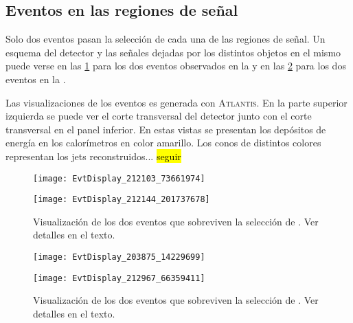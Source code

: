 


\subsection{Eventos en las regiones de señal}

Solo dos eventos pasan la
selección de cada una de las regiones de señal. Un esquema del detector y las
se\~nales dejadas por los distintos objetos en el mismo puede verse en las
\cref{fig:evdisplay_srl} para los dos eventos observados en la {\SRL} y en las
\cref{fig:evdisplay_srh} para los dos eventos en la {\SRH}.

Las visualizaciones de los eventos es generada con
\textsc{Atlantis}\cite{atlantis}.
En la parte superior izquierda se puede ver el corte transversal del detector
junto con el corte transversal en el panel inferior. En estas vistas se presentan
los depósitos de energía en los calorímetros en color amarillo. Los conos de
distintos colores representan los jets reconstruidos... \hl{seguir}



\begin{figure}[!htbp]
  \begin{center}

    \texttt{[image: EvtDisplay\_212103\_73661974]}

    \vspace{1cm}

    \texttt{[image: EvtDisplay\_212144\_201737678]}

    \caption{Visualización de los dos eventos que sobreviven la selección de {\SRL}. Ver detalles en el texto.}
    \label{fig:evdisplay_srl}
  \end{center}
\end{figure}


\begin{figure}[!htbp]
  \begin{center}

    \texttt{[image: EvtDisplay\_203875\_14229699]}

    \vspace{1cm}

    \texttt{[image: EvtDisplay\_212967\_66359411]}

  \caption{Visualización de los dos eventos que sobreviven la selección de {\SRH}. Ver detalles en el texto.}
  \label{fig:evdisplay_srh}
  \end{center}
\end{figure}


